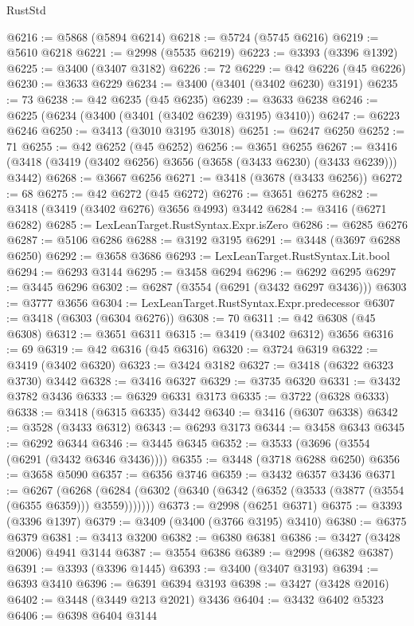 \begin{lexlean}{RustStd}
\begin{coremodule}
@6216 := @5868 (@5894 @6214)
@6218 := @5724 (@5745 @6216)
@6219 := @5610 @6218
@6221 := @2998 (@5535 @6219)
@6223 := @3393 (@3396 @1392)
@6225 := @3400 (@3407 @3182)
@6226 := 72
@6229 := @42 @6226 (@45 @6226)
@6230 := @3633 @6229
@6234 := @3400 (@3401 (@3402 @6230) @3191)
@6235 := 73
@6238 := @42 @6235 (@45 @6235)
@6239 := @3633 @6238
@6246 := @6225 (@6234 (@3400 (@3401 (@3402 @6239) @3195) @3410))
@6247 := @6223 @6246
@6250 := @3413 (@3010 @3195 @3018)
@6251 := @6247 @6250
@6252 := 71
@6255 := @42 @6252 (@45 @6252)
@6256 := @3651 @6255
@6267 := @3416 (@3418 (@3419 (@3402 @6256) @3656 (@3658 (@3433 @6230) (@3433 @6239))) @3442)
@6268 := @3667 @6256
@6271 := @3418 (@3678 (@3433 @6256))
@6272 := 68
@6275 := @42 @6272 (@45 @6272)
@6276 := @3651 @6275
@6282 := @3418 (@3419 (@3402 @6276) @3656 @4993) @3442
@6284 := @3416 (@6271 @6282)
@6285 := LexLeanTarget.RustSyntax.Expr.isZero
@6286 := @6285 @6276
@6287 := @5106 @6286
@6288 := @3192 @3195
@6291 := @3448 (@3697 @6288 @6250)
@6292 := @3658 @3686
@6293 := LexLeanTarget.RustSyntax.Lit.bool
@6294 := @6293 @3144
@6295 := @3458 @6294
@6296 := @6292 @6295
@6297 := @3445 @6296
@6302 := @6287 (@3554 (@6291 (@3432 @6297 @3436)))
@6303 := @3777 @3656
@6304 := LexLeanTarget.RustSyntax.Expr.predecessor
@6307 := @3418 (@6303 (@6304 @6276))
@6308 := 70
@6311 := @42 @6308 (@45 @6308)
@6312 := @3651 @6311
@6315 := @3419 (@3402 @6312) @3656
@6316 := 69
@6319 := @42 @6316 (@45 @6316)
@6320 := @3724 @6319
@6322 := @3419 (@3402 @6320)
@6323 := @3424 @3182
@6327 := @3418 (@6322 @6323 @3730) @3442
@6328 := @3416 @6327
@6329 := @3735 @6320
@6331 := @3432 @3782 @3436
@6333 := @6329 @6331 @3173
@6335 := @3722 (@6328 @6333)
@6338 := @3418 (@6315 @6335) @3442
@6340 := @3416 (@6307 @6338)
@6342 := @3528 (@3433 @6312)
@6343 := @6293 @3173
@6344 := @3458 @6343
@6345 := @6292 @6344
@6346 := @3445 @6345
@6352 := @3533 (@3696 (@3554 (@6291 (@3432 @6346 @3436))))
@6355 := @3448 (@3718 @6288 @6250)
@6356 := @3658 @5090
@6357 := @6356 @3746
@6359 := @3432 @6357 @3436
@6371 := @6267
    (@6268 (@6284 (@6302 (@6340 (@6342 (@6352 (@3533 (@3877 (@3554 (@6355 @6359))) @3559)))))))
@6373 := @2998 (@6251 @6371)
@6375 := @3393 (@3396 @1397)
@6379 := @3409 (@3400 (@3766 @3195) @3410)
@6380 := @6375 @6379
@6381 := @3413 @3200
@6382 := @6380 @6381
@6386 := @3427 (@3428 @2006) @4941 @3144
@6387 := @3554 @6386
@6389 := @2998 (@6382 @6387)
@6391 := @3393 (@3396 @1445)
@6393 := @3400 (@3407 @3193)
@6394 := @6393 @3410
@6396 := @6391 @6394 @3193
@6398 := @3427 (@3428 @2016)
@6402 := @3448 (@3449 @213 @2021) @3436
@6404 := @3432 @6402 @5323
@6406 := @6398 @6404 @3144

\end{coremodule}
\end{lexlean}
